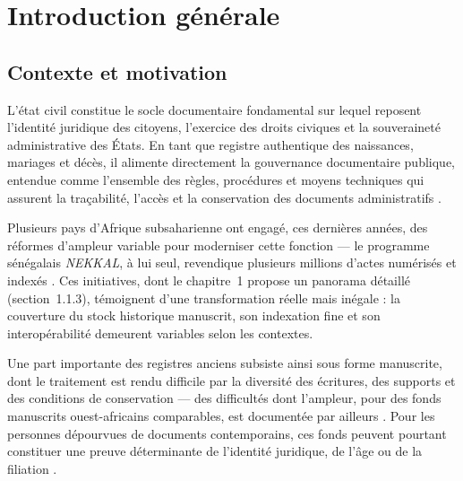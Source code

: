 \chapter*{Introduction générale}

\section*{Contexte et motivation}

L'état civil constitue le socle documentaire fondamental sur lequel reposent l'identité juridique des citoyens, l'exercice des droits civiques et la souveraineté administrative des États.
En tant que registre authentique des naissances, mariages et décès, il alimente directement la gouvernance documentaire publique, entendue comme l'ensemble des règles, procédures et moyens techniques qui assurent la traçabilité, l'accès et la conservation des documents administratifs \cite{michaudSecretsDEtats2015}.

Plusieurs pays d'Afrique subsaharienne ont engagé, ces dernières années, des réformes d'ampleur variable pour moderniser cette fonction --- le programme sénégalais \textit{NEKKAL}, à lui seul, revendique plusieurs millions d'actes numérisés et indexés \cite{civipol2023nekkal}.
Ces initiatives, dont le chapitre~1 propose un panorama détaillé (section~1.1.3), témoignent d'une transformation réelle mais inégale : la couverture du stock historique manuscrit, son indexation fine et son interopérabilité demeurent variables selon les contextes.

Une part importante des registres anciens subsiste ainsi sous forme manuscrite, dont le traitement est rendu difficile par la diversité des écritures, des supports et des conditions de conservation --- des difficultés dont l'ampleur, pour des fonds manuscrits ouest-africains comparables, est documentée par ailleurs \cite{abdoulahi2019contribution}.
Pour les personnes dépourvues de documents contemporains, ces fonds peuvent pourtant constituer une preuve déterminante de l'identité juridique, de l'âge ou de la filiation \cite{uneca2020status}.

